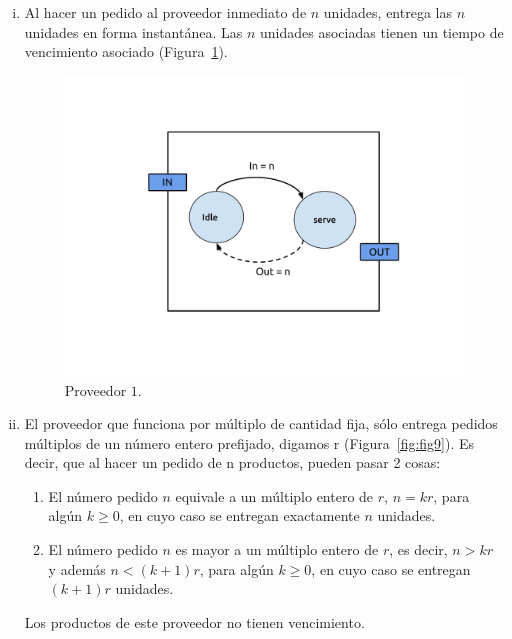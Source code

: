 \documentclass[10pt]{article}
\begin{document}
\begin{enumerate}[i)]
\item Al hacer un pedido al proveedor inmediato de $n$ unidades, entrega las $n$ unidades en forma instantánea. Las $n$ unidades asociadas tienen un tiempo de vencimiento asociado (Figura~\ref{fig:fig8}).

\begin{figure}
\centering
\includegraphics[scale=1]{img/figura8}
\caption{Proveedor $1$.}
\label{fig:fig8}
\end{figure}

\item El proveedor que funciona por múltiplo de cantidad fija, sólo entrega pedidos múltiplos de un número entero prefijado, digamos r (Figura~\ref{fig:fig9}). Es decir, que al hacer un pedido de n productos, pueden pasar 2 cosas:

\begin{enumerate}[1)]
\item El número pedido $n$ equivale a un múltiplo entero de $r$, $n = k r$, para algún $k \geq 0$, en cuyo caso se entregan exactamente $n$ unidades.
\item El número pedido $n$ es mayor a un múltiplo entero de $r$, es decir, $n > k r$ y además $n < (k+1)r$, para algún $k \geq 0$, en cuyo caso se entregan $(k+1)r$ unidades.
\end{enumerate}

Los productos de este proveedor no tienen vencimiento.


\end{enumerate}
\end{document}
